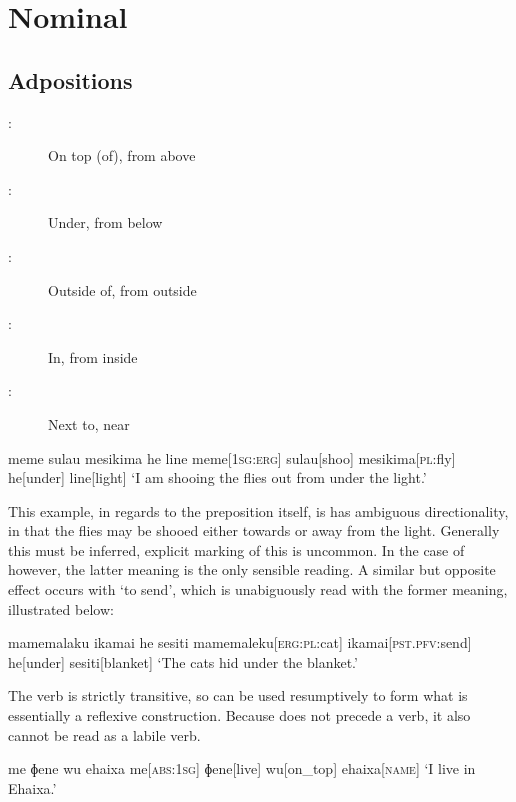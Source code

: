 \chapter{Nominal}

\section{Adpositions}

\begin{description}
  \item[:] On top (of), from above
  \item[:] Under, from below
  \item[:] Outside of, from outside
  \item[:] In, from inside
  \item[:] Next to, near
\end{description}

\ex
\begingl
\glpreamble meme sulau mesikima he line
\endpreamble
meme[\textsc{1sg:erg}]
sulau[shoo]
mesikima[\textsc{pl:}fly]
he[under]
line[light]
\glft `I am shooing the flies out from under the light.'
\endgl
\xe

This example, in regards to the preposition itself, is has ambiguous directionality, in that the flies may be shooed either towards or away from the light. Generally this must be inferred, explicit marking of this is uncommon. In the case of  however, the latter meaning is the only sensible reading. A similar but opposite effect occurs with  `to send', which is unabiguously read with the former meaning, illustrated below:

\ex
\begingl
\glpreamble mamemalaku ikamai he sesiti
\endpreamble
mamemaleku[\textsc{erg:pl:}cat]
ikamai[\textsc{pst.pfv:}send]
he[under]
sesiti[blanket]
\glft `The cats hid under the blanket.'
\endgl
\xe

The verb  is strictly transitive, so  can be used resumptively to form what is essentially a reflexive construction. Because  does not precede a verb, it also cannot be read as a labile verb.

\ex
\begingl
\glpreamble me ɸene wu ehaixa
\endpreamble
me[\textsc{abs:1sg}]
ɸene[live]
wu[on\_top]
ehaixa[\textsc{name}]
\glft `I live in Ehaixa.'
\endgl
\xe

